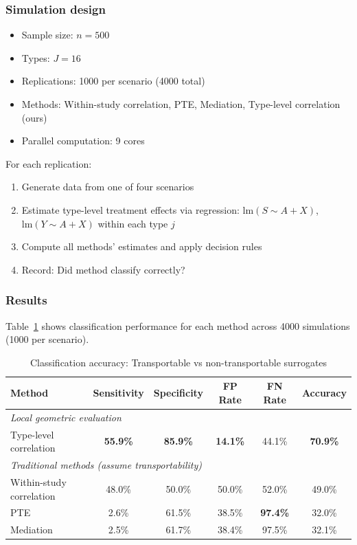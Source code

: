 \subsubsection{Simulation design}

\begin{itemize}
    \item Sample size: $n = 500$
    \item Types: $J = 16$
    \item Replications: 1000 per scenario (4000 total)
    \item Methods: Within-study correlation, PTE, Mediation, Type-level correlation (ours)
    \item Parallel computation: 9 cores
\end{itemize}

For each replication:
\begin{enumerate}
    \item Generate data from one of four scenarios
    \item Estimate type-level treatment effects via regression: $\text{lm}(S \sim A + X)$, $\text{lm}(Y \sim A + X)$ within each type $j$
    \item Compute all methods' estimates and apply decision rules
    \item Record: Did method classify correctly?
\end{enumerate}

\subsubsection{Results}

Table~\ref{tab:classification} shows classification performance for each method across 4000 simulations (1000 per scenario).

\begin{table}[h]
\centering
\caption{Classification accuracy: Transportable vs non-transportable surrogates}
\label{tab:classification}
\begin{tabular}{lccccc}
\toprule
Method & Sensitivity & Specificity & FP Rate & FN Rate & Accuracy \\
\midrule
\multicolumn{6}{l}{\textit{Local geometric evaluation}} \\
Type-level correlation & \textbf{55.9\%} & \textbf{85.9\%} & \textbf{14.1\%} & 44.1\% & \textbf{70.9\%} \\
\midrule
\multicolumn{6}{l}{\textit{Traditional methods (assume transportability)}} \\
Within-study correlation & 48.0\% & 50.0\% & 50.0\% & 52.0\% & 49.0\% \\
PTE & 2.6\% & 61.5\% & 38.5\% & \textbf{97.4\%} & 32.0\% \\
Mediation & 2.5\% & 61.7\% & 38.4\% & 97.5\% & 32.1\% \\
\bottomrule
\end{tabular}
\end{table}

